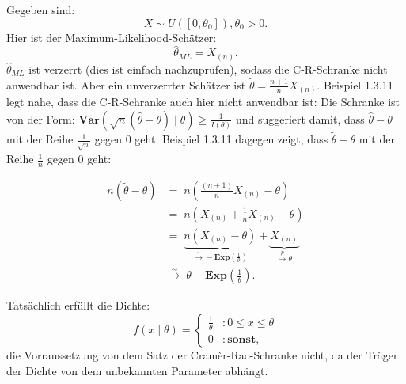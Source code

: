 \documentclass[10pt]{article}
\newcommand{\KW}{\overset{p} \longrightarrow} %
\newcommand{\KV}{\overset{\sim} \longrightarrow} %
\newcommand{\Var}{\textbf{Var}} %
\newenvironment{BSP}[1][]
{\begin{Beispiel}[frametitle=#1]}{\end{Beispiel}}
\begin{document}
	\begin{BSP}[Beispiel 1.4.4 (Anwendung C-R-Schranke Gleichverteilung)]
		Gegeben sind:
		\begin{equation*}
		X {\sim} U([0, \theta_0]), \theta_0 > 0.
		\end{equation*}
		Hier ist der Maximum-Likelihood-Schätzer:
		\begin{equation*}
			\hat{\theta}_{ML} = X_{(n)}.
		\end{equation*}
		$\hat{\theta}_{ML}$ ist verzerrt (dies ist einfach nachzuprüfen), sodass die C-R-Schranke nicht anwendbar ist. Aber ein unverzerrter Schätzer ist $\tilde{\theta} = \frac{n+1}{n} X_{(n)}$. Beispiel 1.3.11 legt nahe, dass die C-R-Schranke auch hier nicht anwendbar ist: Die Schranke ist von der Form: $\Var(\sqrt{n}(\hat{\theta}-\theta)\mid \theta) \geq \frac{1}{I(\theta)}$ und suggeriert damit, dass $\hat{\theta} - \theta$ mit der Reihe $\frac{1}{\sqrt{n}}$ gegen $0$ geht. Beispiel 1.3.11 dagegen zeigt, dass $\tilde{\theta} - \theta$ mit der Reihe $\frac{1}{n}$ gegen $0$ geht:
		
		\begin{equation*}
			\begin{split}
				n(\tilde{\theta} - \theta) &= \; n \left(\frac{(n+1)}{n} X_{(n)}- \theta\right)\\
				&= \; n\left(X_{(n)} + \frac{1}{n}X_{(n)}-\theta\right)\\
				&= \; \underbrace{n(X_{(n)} - \theta)}_{\KV - \textbf{Exp}\left(\frac{1}{\theta}\right)} + \underbrace{X_{(n)}}_{\KW \theta}\\
				&\KV \; \theta - \textbf{Exp}\left(\frac{1}{\theta}\right).
			\end{split}
		\end{equation*}
	
		Tatsächlich erfüllt die Dichte:
		\begin{equation*}
			f(x\mid \theta) = 
			\begin{cases}
				\frac{1}{\theta} &: 0 \leq x \leq \theta\\
				0 &: \textbf{sonst},
			\end{cases}
		\end{equation*}
		die Vorraussetzung von dem Satz der Cramèr-Rao-Schranke nicht, da der Träger der Dichte von dem unbekannten Parameter abhängt. 
	\end{BSP}
	
\end{document}
